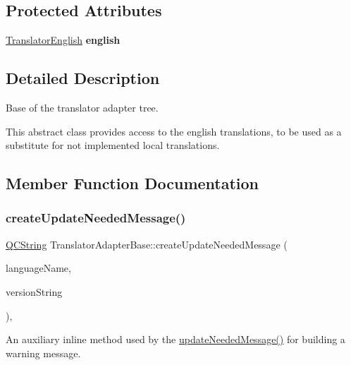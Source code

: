 \subsection*{Protected Attributes}
\begin{DoxyCompactItemize}
\item 
\mbox{\label{class_translator_adapter_base_a75fd1d1116debf9adacfef772a04a7b1}} 
\mbox{\hyperlink{class_translator_english}{Translator\+English}} {\bfseries english}
\end{DoxyCompactItemize}


\subsection{Detailed Description}
Base of the translator adapter tree.

This abstract class provides access to the english translations, to be used as a substitute for not implemented local translations. 

\subsection{Member Function Documentation}
\mbox{\label{class_translator_adapter_base_a71493b87a34d6e4c232e540734aba698}} 
\subsubsection{\texorpdfstring{createUpdateNeededMessage()}{createUpdateNeededMessage()}}
{\footnotesize\ttfamily \mbox{\hyperlink{class_q_c_string}{Q\+C\+String}} Translator\+Adapter\+Base\+::create\+Update\+Needed\+Message (\begin{DoxyParamCaption}\item[{const \mbox{\hyperlink{class_q_c_string}{Q\+C\+String}} \&}]{language\+Name,  }\item[{const \mbox{\hyperlink{class_q_c_string}{Q\+C\+String}} \&}]{version\+String }\end{DoxyParamCaption})\hspace{0.3cm}{\ttfamily [inline]}, {\ttfamily [protected]}}

An auxiliary inline method used by the \mbox{\hyperlink{class_translator_adapter_base_acc5b89c39bae2a9bca490016ec15c79f}{update\+Needed\+Message()}} for building a warning message. \mbox{\label{class_translator_adapter_base_acc5b89c39bae2a9bca490016ec15c79f}} 
